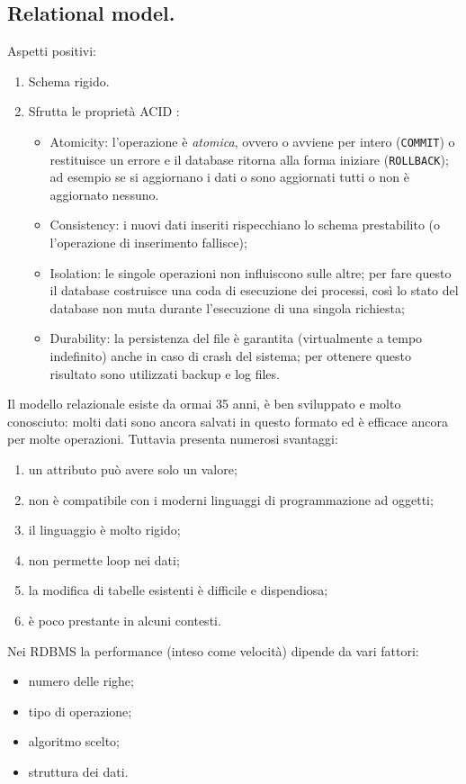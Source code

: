 \documentclass[a4page, 11pt]{article}
\begin{document}
\subsection{Relational model.}
Aspetti positivi:
\begin{enumerate}[noitemsep]
\item Schema rigido.
\item Sfrutta le proprietà ACID :
  \begin{itemize}
  \item Atomicity: l'operazione è \textit{atomica}, ovvero o avviene per intero (\texttt{COMMIT}) o restituisce un errore e il database ritorna alla forma iniziare (\texttt{ROLLBACK}); ad esempio se si aggiornano i dati o sono aggiornati tutti o non è aggiornato nessuno.
  \item Consistency: i nuovi dati inseriti rispecchiano lo schema prestabilito (o l'operazione di inserimento fallisce);
  \item Isolation: le singole operazioni non influiscono sulle altre; per fare questo il database costruisce una coda di esecuzione dei processi, così lo stato del database non muta durante l'esecuzione di una singola richiesta;
  \item Durability: la persistenza del file è garantita (virtualmente a tempo indefinito) anche in caso di crash del sistema; per ottenere questo risultato sono utilizzati backup e log files.
  \end{itemize}
\end{enumerate}
Il modello relazionale esiste da ormai 35 anni, è ben sviluppato e molto conosciuto: molti dati sono ancora salvati in questo formato ed è efficace ancora per molte operazioni. Tuttavia presenta numerosi svantaggi:
\begin{enumerate}[noitemsep]
\item un attributo può avere solo un valore;
\item non è compatibile con i moderni linguaggi di programmazione ad oggetti;
\item il linguaggio è molto rigido;
\item non permette loop nei dati;
\item la modifica di tabelle esistenti è difficile e dispendiosa;
\item è poco prestante in alcuni contesti.
\end{enumerate}
Nei RDBMS la performance (inteso come velocità) dipende da vari fattori:
\begin{itemize}[noitemsep]
\item numero delle righe;
\item tipo di operazione;
\item algoritmo scelto;
\item struttura dei dati.
\end{itemize}
\end{document}

